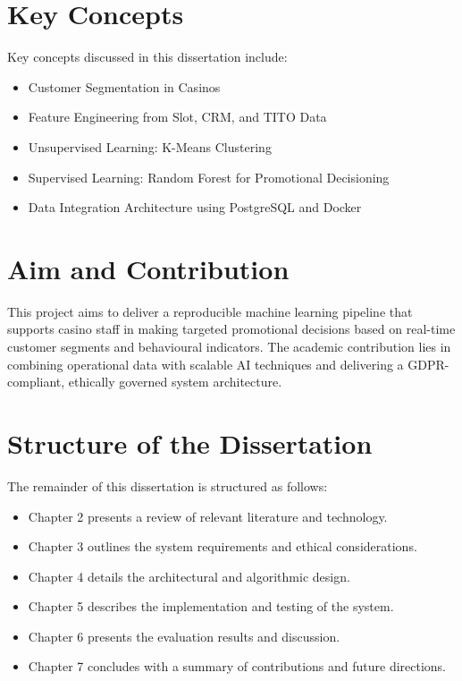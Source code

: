 \section{Key Concepts}
Key concepts discussed in this dissertation include:
\begin{itemize}
  \item Customer Segmentation in Casinos
  \item Feature Engineering from Slot, CRM, and TITO Data
  \item Unsupervised Learning: K-Means Clustering
  \item Supervised Learning: Random Forest for Promotional Decisioning
  \item Data Integration Architecture using PostgreSQL and Docker
\end{itemize}

\section{Aim and Contribution}
This project aims to deliver a reproducible machine learning pipeline that supports casino staff in making targeted promotional decisions based on real-time customer segments and behavioural indicators. The academic contribution lies in combining operational data with scalable AI techniques and delivering a GDPR-compliant, ethically governed system architecture.

\section{Structure of the Dissertation}
The remainder of this dissertation is structured as follows:
\begin{itemize}
  \item Chapter 2 presents a review of relevant literature and technology.
  \item Chapter 3 outlines the system requirements and ethical considerations.
  \item Chapter 4 details the architectural and algorithmic design.
  \item Chapter 5 describes the implementation and testing of the system.
  \item Chapter 6 presents the evaluation results and discussion.
  \item Chapter 7 concludes with a summary of contributions and future directions.
\end{itemize}
